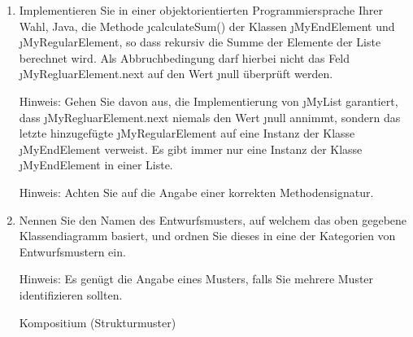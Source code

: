 \documentclass{lehramt-informatik-aufgabe}
\begin{document}
\begin{enumerate}


\item Implementieren Sie in einer objektorientierten Programmiersprache
Ihrer Wahl, \zB Java, die Methode \j{calculateSum()} der Klassen
\j{MyEndElement} und \j{MyRegularElement}, so dass rekursiv die Summe
der Elemente der Liste berechnet wird. Als Abbruchbedingung darf hierbei
nicht das Feld \j{MyRegluarElement.next} auf den Wert \j{null} überprüft
werden.

Hinweis: Gehen Sie davon aus, die Implementierung von \j{MyList}
garantiert, dass \j{MyRegluarElement.next} niemals den Wert \j{null}
annimmt, sondern das letzte hinzugefügte \j{MyRegularElement} auf eine
Instanz der Klasse \j{MyEndElement} verweist. Es gibt immer nur eine
Instanz der Klasse \j{MyEndElement} in einer Liste.

Hinweis: Achten Sie auf die Angabe einer korrekten Methodensignatur.

\begin{liAntwort}
\end{liAntwort}


\item Nennen Sie den Namen des Entwurfsmusters, auf welchem das oben
gegebene Klassendiagramm basiert, und ordnen Sie dieses in eine der
Kategorien von Entwurfsmustern ein.

Hinweis: Es genügt die Angabe eines Musters, falls Sie mehrere Muster
identifizieren sollten.

\begin{liAntwort}
Kompositium (Strukturmuster)
\end{liAntwort}
\end{enumerate}
\end{document}
